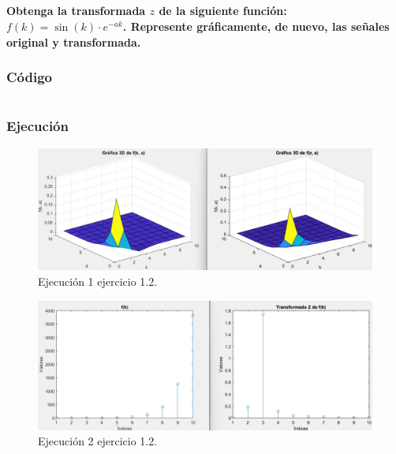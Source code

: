 \documentclass[a4paper, 12pt]{article}
\begin{document}
    \subsection{}
    \paragraph{Obtenga la transformada $z$ de la siguiente función: $f(k) = \sin(k) \cdot e^{-ak}$. Represente gráficamente, de nuevo, las señales original y transformada.}
    \subsubsection*{Código}
	\inputminted[fontsize=\scriptsize, linenos, breaklines=true, xleftmargin=0.75cm, frame=lines]{matlab}{code/parte2/Ej1p2.m}

	\subsubsection*{Ejecución}
    
    \begin{figure}[htp!]
        \centering
        \includegraphics[width=1\textwidth]{figures/Parte2Ej1p2f1.png}
        \caption{Ejecución 1 ejercicio 1.2.}
    \end{figure}
        
    \begin{figure}[htp!]
        \centering
        \includegraphics[width=1\textwidth]{figures/Parte2Ej1p2f2.png}
        \caption{Ejecución 2 ejercicio 1.2.}
    \end{figure}
\end{document}
